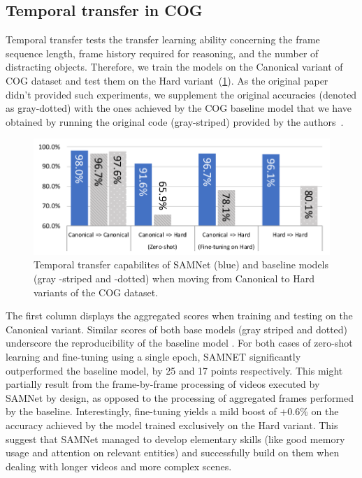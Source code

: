 \subsection{Temporal transfer in COG}
\label{sec:temporal}

Temporal transfer tests the transfer learning ability concerning the frame sequence length, frame history required for reasoning, and the number of distracting objects.
Therefore, we train the models on the Canonical variant of COG dataset and test them on the Hard variant~(\cref{fig:samnet_cog_overall_transfer}).
As the original paper~\cite{yang2018dataset} didn't provided such experiments, we supplement the original accuracies (denoted as gray-dotted) with the ones achieved by the COG baseline model that we have obtained by running the original code (gray-striped) provided by the authors~\cite{yang2018implement}.

\begin{figure}[htbp]
	\centering
	\includegraphics[width=\columnwidth]{../img/plots/cog_temporal_transfer_baselines.pdf}
	\caption{Temporal transfer capabilites of SAMNet (blue) and baseline models (gray -striped and -dotted) when moving from Canonical to Hard variants of the COG dataset.}
	\label{fig:samnet_cog_overall_transfer}
\end{figure}

The first column displays the aggregated scores when training and testing on the Canonical variant.
Similar scores of both base models (gray striped and dotted) underscore the reproducibility of the baseline model .
For both cases of zero-shot learning and fine-tuning using a single epoch, SAMNET significantly outperformed the baseline model, by 25 and 17 points respectively.
This might partially result from the frame-by-frame processing of videos executed by SAMNet by design, as opposed to the processing of aggregated frames performed by the baseline.
Interestingly, fine-tuning yields a mild boost of +0.6\% on the accuracy achieved by the model trained exclusively on the Hard variant.
This suggest that SAMNet managed to develop elementary skills (like good memory usage and attention on relevant entities) and successfully build on them when dealing with longer videos and more complex scenes.


